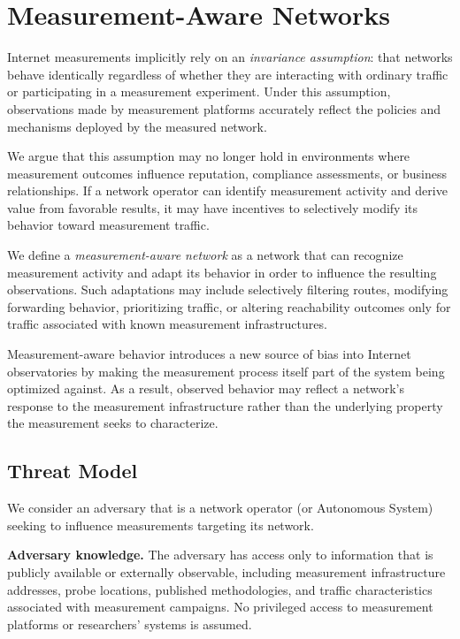 \documentclass[sigconf, 10pt, anonymous, nonacm]{acmart}
\begin{document}
\section{Measurement-Aware Networks}

Internet measurements implicitly rely on an \emph{invariance assumption}: that networks behave identically regardless of whether they are interacting with ordinary traffic or participating in a measurement experiment. Under this assumption, observations made by measurement platforms accurately reflect the policies and mechanisms deployed by the measured network.

We argue that this assumption may no longer hold in environments where measurement outcomes influence reputation, compliance assessments, or business relationships. If a network operator can identify measurement activity and derive value from favorable results, it may have incentives to selectively modify its behavior toward measurement traffic.

We define a \emph{measurement-aware network} as a network that can recognize measurement activity and adapt its behavior in order to influence the resulting observations. Such adaptations may include selectively filtering routes, modifying forwarding behavior, prioritizing traffic, or altering reachability outcomes only for traffic associated with known measurement infrastructures.

Measurement-aware behavior introduces a new source of bias into Internet observatories by making the measurement process itself part of the system being optimized against. As a result, observed behavior may reflect a network's response to the measurement infrastructure rather than the underlying property the measurement seeks to characterize.

\subsection{Threat Model}

We consider an adversary that is a network operator (or Autonomous System) seeking to influence measurements targeting its network.

\textbf{Adversary knowledge.} The adversary has access only to information that is publicly available or externally observable, including measurement infrastructure addresses, probe locations, published methodologies, and traffic characteristics associated with measurement campaigns. No privileged access to measurement platforms or researchers' systems is assumed.
\end{document}
